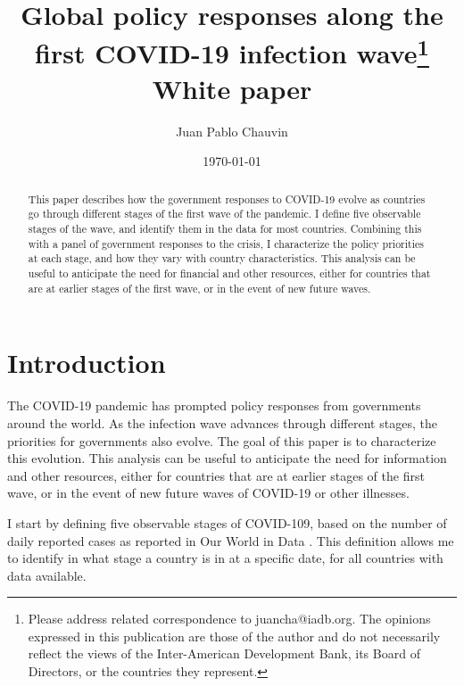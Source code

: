 \documentclass[12pt,english]{article}
\title{{\Large{}Global policy responses along the first COVID-19 infection wave\footnote{Please address related correspondence to juancha@iadb.org. The opinions expressed in this publication are those of the author and do not necessarily reflect the views of the Inter-American Development Bank, its Board of Directors, or the countries they represent.} \\ White paper}}
\author{Juan Pablo Chauvin}
\affil{Research Department, Inter-American Development Bank}
\begin{document}
\begin{titlepage}

\date{\today\\
\vspace{-10bp}
}

\maketitle
\begin{abstract}
\noindent


This paper describes how the government responses to  COVID-19 evolve as countries go through different stages of the first wave of the pandemic.  I define five observable stages of the wave, and identify them in the data for most countries. Combining this with a panel of government responses to the crisis, I characterize the policy priorities at each stage, and how they vary with country characteristics. This analysis can be useful to anticipate the need for financial and other resources, either for countries that are at earlier stages of the first wave, or in the event of new future waves.



\bigskip
\end{abstract}
\setcounter{page}{0}
\thispagestyle{empty}
\end{titlepage}
\pagebreak \newpage


\onehalfspace


\section{Introduction}

The COVID-19 pandemic has prompted policy responses from governments around the world.  As the infection wave advances through different stages, the priorities for governments also evolve.  The goal of this paper is to characterize this evolution.  This analysis can be useful to anticipate the need for information and other resources, either for countries that are at earlier stages of the first wave, or in the event of new future waves of COVID-19 or other illnesses.

I start by defining five observable stages of COVID-109, based on the number of daily reported cases as reported in Our World in Data \citep{Roser2020}.  This definition allows me to identify in what stage a country is in at a specific date, for all countries with data available.
\end{document}
